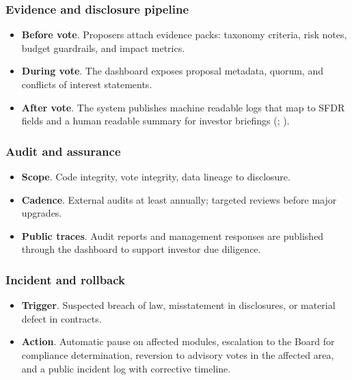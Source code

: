 \documentclass[
  english,
  12pt,
  oneside,
  open=any]{scrbook}
\providecommand{\tightlist}{%
  \setlength{\itemsep}{0pt}\setlength{\parskip}{0pt}}\usepackage{longtable,booktabs,array}
\begin{document}
\subsubsection{Evidence and disclosure
pipeline}\label{evidence-and-disclosure-pipeline}

\begin{itemize}
\tightlist
\item
  \textbf{Before vote}. Proposers attach evidence packs: taxonomy
  criteria, risk notes, budget guardrails, and impact metrics.\\
\item
  \textbf{During vote}. The dashboard exposes proposal metadata, quorum,
  and conflicts of interest statements.\\
\item
  \textbf{After vote}. The system publishes machine readable logs that
  map to SFDR fields and a human readable summary for investor briefings
  (; ).
\end{itemize}

\subsubsection{Audit and assurance}\label{audit-and-assurance}

\begin{itemize}
\tightlist
\item
  \textbf{Scope}. Code integrity, vote integrity, data lineage to
  disclosure.\\
\item
  \textbf{Cadence}. External audits at least annually; targeted reviews
  before major upgrades.\\
\item
  \textbf{Public traces}. Audit reports and management responses are
  published through the dashboard to support investor due diligence.
\end{itemize}

\subsubsection{Incident and rollback}\label{incident-and-rollback}

\begin{itemize}
\tightlist
\item
  \textbf{Trigger}. Suspected breach of law, misstatement in
  disclosures, or material defect in contracts.\\
\item
  \textbf{Action}. Automatic pause on affected modules, escalation to
  the Board for compliance determination, reversion to advisory votes in
  the affected area, and a public incident log with corrective timeline.
\end{itemize}
\end{document}

